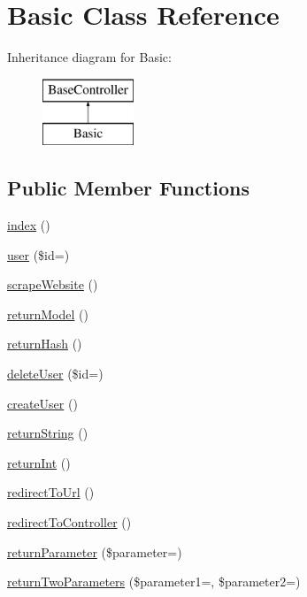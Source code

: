 \hypertarget{class_basic}{}\section{Basic Class Reference}
\label{class_basic}
Inheritance diagram for Basic\+:\begin{figure}[H]
\begin{center}
\leavevmode
\includegraphics[height=2.000000cm]{class_basic}
\end{center}
\end{figure}
\subsection*{Public Member Functions}
\begin{DoxyCompactItemize}
\item 
\hyperlink{class_basic_a149eb92716c1084a935e04a8d95f7347}{index} ()
\item 
\hyperlink{class_basic_a6603546e99f9519b86989be128736ad6}{user} (\$id=\textquotesingle{}\textquotesingle{})
\item 
\hyperlink{class_basic_a48ffe9a27b91ce968b2bcf5e0a9d4069}{scrape\+Website} ()
\item 
\hyperlink{class_basic_a7cb6a02987f0faaef2ee4aff9198907e}{return\+Model} ()
\item 
\hyperlink{class_basic_a16df2136bd66a75022f350d583e6c060}{return\+Hash} ()
\item 
\hyperlink{class_basic_a934aeeec370d904f3a58bde4d514259d}{delete\+User} (\$id=\textquotesingle{}\textquotesingle{})
\item 
\hyperlink{class_basic_a967982ee98f05287bbdba812f6016947}{create\+User} ()
\item 
\hyperlink{class_basic_a5bb666dcea19a9561c2047cfa25936bd}{return\+String} ()
\item 
\hyperlink{class_basic_a8d2918087022004ef5ad62d8f76a73d7}{return\+Int} ()
\item 
\hyperlink{class_basic_abf786273f796a96f5532dc60f9cec813}{redirect\+To\+Url} ()
\item 
\hyperlink{class_basic_a53f01fc4c43d1cecc497d9645f920407}{redirect\+To\+Controller} ()
\item 
\hyperlink{class_basic_ac380e8a432563c6affcfddd43384c1d2}{return\+Parameter} (\$parameter=\textquotesingle{}\textquotesingle{})
\item 
\hyperlink{class_basic_a2ef87b96abcca966a41e34d077fcc38e}{return\+Two\+Parameters} (\$parameter1=\textquotesingle{}\textquotesingle{}, \$parameter2=\textquotesingle{}\textquotesingle{})
\end{DoxyCompactItemize}
